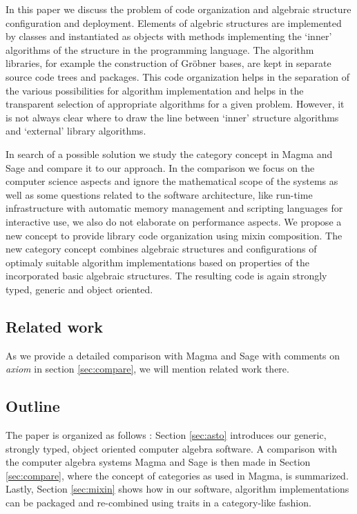 \documentclass{llncs}
\begin{document}
In this paper we discuss the problem of code organization and
algebraic structure configuration and deployment. Elements of algebric
structures are implemented by classes and instantiated as objects with
methods implementing the `inner' algorithms of the structure in the
programming language. The algorithm libraries, for example the
construction of Gr\"obner bases, are kept in separate source code trees
and packages. This code organization helps in the separation of the
various possibilities for algorithm implementation and helps in the
transparent selection of appropriate algorithms for a given problem.
However, it is not always clear where to draw the line between `inner'
structure algorithms and `external' library algorithms.

In search of a possible solution we study the category concept in
Magma \cite{BosmaCannonPlayoust:1997} and Sage \cite{Stein:2005} and
compare it to our approach. In the comparison we focus on the computer
science aspects and ignore the mathematical scope of the systems as
well as some questions related to the software architecture, like
run-time infrastructure with automatic memory management and scripting
languages for interactive use, we also do not elaborate on performance
aspects.
%
We propose a new concept to provide library code organization
using mixin composition. The new category concept combines algebraic
structures and configurations of optimaly suitable algorithm
implementations based on properties of the incorporated basic
algebraic structures.  The resulting code is again strongly typed,
generic and object oriented.


\subsection{Related work} %

As we provide a detailed comparison with Magma
\cite{BosmaCannonPlayoust:1997} and Sage \cite{Stein:2005} with
comments on {\em axiom} \cite{JenksSutor:1992,Watt:2003} in section
\ref{sec:compare}, we will mention related work there.


\subsection{Outline} %

The paper is organized as follows : Section \ref{sec:asto} introduces
our generic, strongly typed, object oriented computer algebra
software. A comparison with the computer algebra systems Magma and
Sage is then made in Section \ref{sec:compare}, where the concept of
categories as used in Magma, is summarized. Lastly, Section
\ref{sec:mixin} shows how in our software, algorithm implementations
can be packaged and re-combined using traits in a category-like
fashion.
\end{document}
